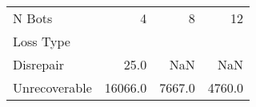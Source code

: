 \begin{tabular}{lrrr}
\toprule
N Bots &       4  &      8  &      12 \\
Loss Type     &          &         &         \\
\midrule
Disrepair     &     25.0 &     NaN &     NaN \\
Unrecoverable &  16066.0 &  7667.0 &  4760.0 \\
\bottomrule
\end{tabular}
